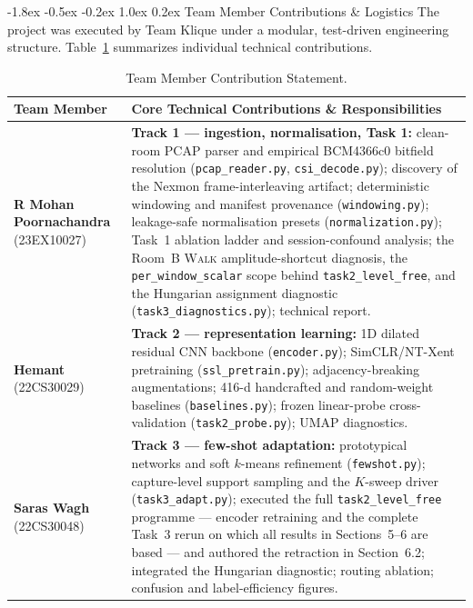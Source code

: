 \documentclass[10pt,a4paper]{article}
\makeatletter
\renewcommand{\section}{\@startsection{section}{1}{\z@}%
  {-1.8ex \@plus -0.5ex \@minus -0.2ex}%
  {1.0ex \@plus 0.2ex}%
  {\normalfont\large\bfseries\color{primary}}}
\makeatother
\begin{document}
\section{Team Member Contributions \& Logistics}
The project was executed by Team Klique under a modular, test-driven engineering structure. Table~\ref{tab:contributions} summarizes individual technical contributions.

\begin{table}[htbp]
\centering
\footnotesize
\setlength{\tabcolsep}{4pt}
\caption{Team Member Contribution Statement.}
\label{tab:contributions}
\begin{tabular}{p{}p{}}
\toprule
\textbf{Team Member} & \textbf{Core Technical Contributions \& Responsibilities} \\
\midrule
\textbf{R Mohan Poornachandra} \newline (23EX10027) & \textbf{Track 1 --- ingestion, normalisation, Task 1:} clean-room PCAP parser and empirical BCM4366c0 bitfield resolution (\texttt{pcap\_reader.py}, \texttt{csi\_decode.py}); discovery of the Nexmon frame-interleaving artifact; deterministic windowing and manifest provenance (\texttt{windowing.py}); leakage-safe normalisation presets (\texttt{normalization.py}); Task~1 ablation ladder and session-confound analysis; the Room~B \textsc{Walk} amplitude-shortcut diagnosis, the \texttt{per\_window\_scalar} scope behind \texttt{task2\_level\_free}, and the Hungarian assignment diagnostic (\texttt{task3\_diagnostics.py}); technical report. \\
\midrule
\textbf{Hemant} \newline (22CS30029) & \textbf{Track 2 --- representation learning:} 1D dilated residual CNN backbone (\texttt{encoder.py}); SimCLR/NT-Xent pretraining (\texttt{ssl\_pretrain.py}); adjacency-breaking augmentations; 416-d handcrafted and random-weight baselines (\texttt{baselines.py}); frozen linear-probe cross-validation (\texttt{task2\_probe.py}); UMAP diagnostics. \\
\midrule
\textbf{Saras Wagh} \newline (22CS30048) & \textbf{Track 3 --- few-shot adaptation:} prototypical networks and soft $k$-means refinement (\texttt{fewshot.py}); capture-level support sampling and the $K$-sweep driver (\texttt{task3\_adapt.py}); executed the full \texttt{task2\_level\_free} programme --- encoder retraining and the complete Task~3 rerun on which all results in Sections~5--6 are based --- and authored the retraction in Section~6.2; integrated the Hungarian diagnostic; routing ablation; confusion and label-efficiency figures. \\
\bottomrule
\end{tabular}
\end{table}
\end{document}
